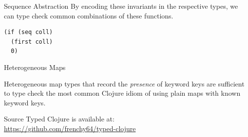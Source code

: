 \documentclass[landscape,final,a0paper,fontscale=0.277]{baposter}
\begin{document}
\begin{poster}
\begin{posterbox}[name=sequenceabs,column=1]{Sequence Abstraction}
By encoding these invariants in the respective types, 
we can type check common combinations of these functions.

\begin{lstlisting}[caption={Assuming \lstinline|coll| is a collection of numbers currently in local scope, we can infer that this expression always returns a number}]
(if (seq coll)
  (first coll)
  0)
\end{lstlisting}
\end{posterbox}

\begin{posterbox}[name=hmaps,column=1,below=sequenceabs]{Heterogeneous Maps}

Heterogeneous map types that record the \emph{presence} of keyword keys
are sufficient to type check the most common Clojure idiom of using plain maps with known keyword keys.


\end{posterbox}


\begin{posterbox}[name=source,column=2]{Source}
Typed Clojure is available at:\\\url{https://github.com/frenchy64/typed-clojure}
\end{posterbox}



\end{poster}
\end{document}
